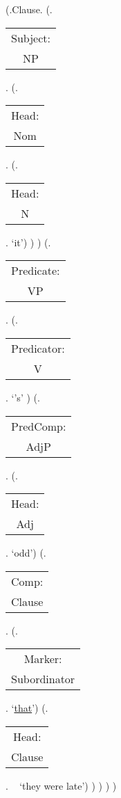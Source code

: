 \documentclass[12pt,letterpaper]{article}
\begin{document}
\begin{figure}
	\begin{center}
		\begin{parsetree}
			(.Clause.
			(.\begin{tabular}{c}Subject:\\NP\end{tabular}.
			(.\begin{tabular}{c}Head:\\Nom\end{tabular}.
			(.\begin{tabular}{c}Head:\\N\end{tabular}. `it')
			)
			)
			(.\begin{tabular}{c}Predicate:\\VP\end{tabular}.
			(.\begin{tabular}{c}Predicator:\\V\end{tabular}. `{'s}' )
			(.\begin{tabular}{c}PredComp:\\AdjP\end{tabular}.
				(.\begin{tabular}{c}Head:\\Adj\end{tabular}. `odd')
				(.\begin{tabular}{c}Comp:\\Clause\end{tabular}.
					(.\begin{tabular}{c}Marker:\\Subordinator\end{tabular}. `\underline{that}')
					(.\begin{tabular}{c}Head:\\Clause\end{tabular}. ~ `they were late')
					)
				)
			)
			)
			

\end{parsetree}
\end{center}
\end{figure}
\end{document}

